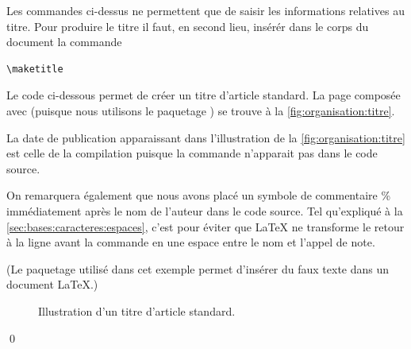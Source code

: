 Les commandes ci-dessus ne permettent que de saisir les informations
relatives au titre. Pour produire le titre il faut, en second lieu,
insérér dans le corps du document la commande
\begin{lstlisting}
\maketitle
\end{lstlisting}

\begin{exemple}
  \label{ex:organisation:titre}
  Le code ci-dessous permet de créer un titre d'article standard. La
  page composée avec {\XeLaTeX} (puisque nous utilisons le paquetage
  ) se trouve à la \autoref{fig:organisation:titre}.
  \begin{demo}
    
  \end{demo}

  La date de publication apparaissant dans l'illustration de la
  \autoref*{fig:organisation:titre} est celle de la compilation
  puisque la commande \cmdprint{\date} n'apparait pas dans le code
  source.

  On remarquera également que nous avons placé un symbole de
  commentaire \% immédiatement après le nom de l'auteur dans le code
  source. Tel qu'expliqué à la \ref{sec:bases:caracteres:espaces},
  c'est pour éviter que {\LaTeX} ne transforme le retour à la ligne avant
  la commande \cmd{\thanks} en une espace entre le nom et l'appel de
  note.

  (Le paquetage  utilisé dans cet exemple permet
  d'insérer du faux texte 
  dans un document \LaTeX.)
  \begin{figure}
    \centering
    \caption{Illustration d'un titre d'article standard.}
    \label{fig:organisation:titre}
  \end{figure}
  \qed
\end{exemple}

